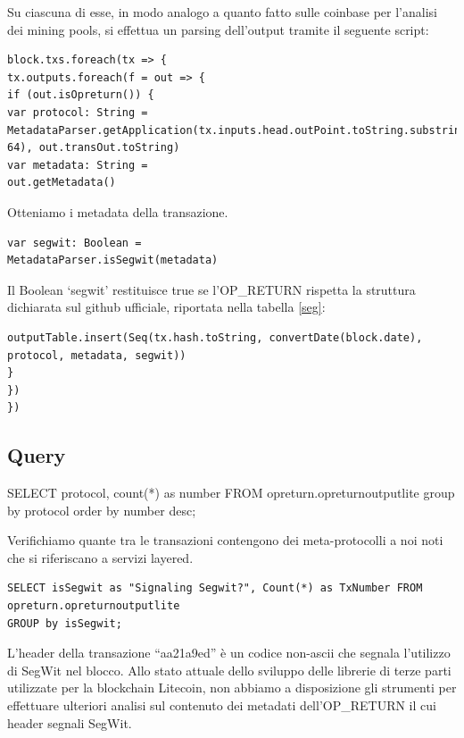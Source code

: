 Su ciascuna di esse, in modo analogo a quanto fatto sulle coinbase per l’analisi dei mining pools, si effettua un parsing dell’output tramite il seguente script:

\begin{lstlisting}
block.txs.foreach(tx => {
tx.outputs.foreach(f = out => {
if (out.isOpreturn()) {
var protocol: String =
MetadataParser.getApplication(tx.inputs.head.outPoint.toString.substring(0, 64), out.transOut.toString)
var metadata: String =
out.getMetadata()
\end{lstlisting}

Otteniamo i metadata della transazione.

\begin{lstlisting}
var segwit: Boolean =
MetadataParser.isSegwit(metadata)
\end{lstlisting}

Il Boolean ‘segwit’ restituisce true se l’OP\_RETURN rispetta la struttura dichiarata sul github ufficiale, riportata nella tabella \ref{seg}:


\begin{lstlisting}
outputTable.insert(Seq(tx.hash.toString, convertDate(block.date), protocol, metadata, segwit))
}
})
})
\end{lstlisting}
\subsection{Query}

SELECT protocol, count(*) as number FROM opreturn.opreturnoutputlite
group by protocol order by number desc;

Verifichiamo quante tra le transazioni contengono dei meta-protocolli a noi noti che si riferiscano a servizi layered.

\begin{lstlisting}
SELECT isSegwit as "Signaling Segwit?", Count(*) as TxNumber FROM opreturn.opreturnoutputlite
GROUP by isSegwit;
\end{lstlisting}

L’header della transazione “aa21a9ed” è un codice non-ascii che segnala l’utilizzo di SegWit nel blocco. Allo stato attuale dello sviluppo delle librerie di terze parti utilizzate per la blockchain Litecoin, non abbiamo a disposizione gli strumenti per effettuare ulteriori analisi sul contenuto dei metadati dell’OP\_RETURN il cui header segnali SegWit.

